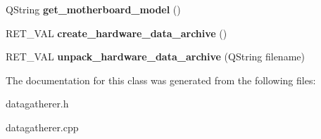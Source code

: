 \begin{DoxyCompactItemize}
\item 
\hypertarget{classDataGatherer_a5a2de7e19f4a673e1f88e962f8b32588}{Q\-String {\bfseries get\-\_\-motherboard\-\_\-model} ()}\label{classDataGatherer_a5a2de7e19f4a673e1f88e962f8b32588}

\item 
\hypertarget{classDataGatherer_a5071be7a22f26a1e8c4956fd88756aa6}{R\-E\-T\-\_\-\-V\-A\-L {\bfseries create\-\_\-hardware\-\_\-data\-\_\-archive} ()}\label{classDataGatherer_a5071be7a22f26a1e8c4956fd88756aa6}

\item 
\hypertarget{classDataGatherer_aaea8e9ae23a7f6ea5e0b1b04e9125596}{R\-E\-T\-\_\-\-V\-A\-L {\bfseries unpack\-\_\-hardware\-\_\-data\-\_\-archive} (Q\-String filename)}\label{classDataGatherer_aaea8e9ae23a7f6ea5e0b1b04e9125596}

\end{DoxyCompactItemize}


The documentation for this class was generated from the following files\-:\begin{DoxyCompactItemize}
\item 
datagatherer.\-h\item 
datagatherer.\-cpp\end{DoxyCompactItemize}
